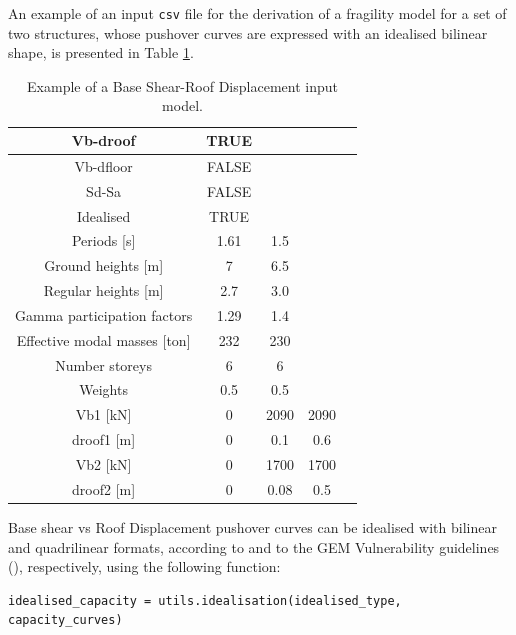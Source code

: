 An example of an input \verb=csv= file for the derivation of a fragility model for a set of two structures, whose pushover curves are expressed with an idealised bilinear shape, is presented in Table \ref{table:Vb-droof_input}.

\begin {table}[htb]
\caption{Example of a Base Shear-Roof Displacement input model.}
\label{table:Vb-droof_input}
\begin{center}
  \begin{tabular}{ | c | c | c | c | c |}
  \hline
    Vb-droof & TRUE &  &  \\ \hline
    Vb-dfloor & FALSE & & \\ \hline
    Sd-Sa & FALSE & & \\ \hline
    Idealised & TRUE & & \\ \hline
    Periods [s] & 1.61 & 1.5 & \\ \hline
    Ground heights [m] & 7 & 6.5 & \\ \hline
    Regular heights [m] & 2.7 & 3.0 & \\ \hline
    Gamma participation factors & 1.29 & 1.4 & \\ \hline
    Effective modal masses [ton] & 232 &	230 &  \\ \hline
    Number storeys & 6 & 6 & \\ \hline
    Weights & 0.5 & 0.5 & \\ \hline
    Vb1 [kN] & 0 & 2090 & 2090 \\ \hline
    droof1 [m] & 0 & 0.1 & 0.6 \\ \hline
    Vb2 [kN] & 0 & 1700 & 1700 \\ \hline
    droof2 [m] & 0 & 0.08 & 0.5 \\ \hline
  \end{tabular}
\end{center}
\end{table}

Base shear vs Roof Displacement pushover curves can be idealised with bilinear and quadrilinear formats, according to \citep{FEMA4402005} and to the GEM Vulnerability guidelines (\citep{Dayala2014}), respectively, using the following function:

\begin{Verbatim}[frame=single, commandchars=\\\{\}, samepage=true]
idealised_capacity = utils.idealisation(idealised_type, capacity_curves)
\end{Verbatim}

